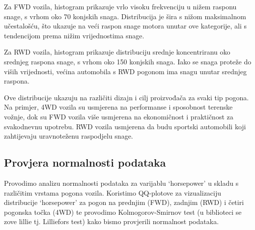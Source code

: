 \documentclass[
]{article}
\newenvironment{Shaded}{\begin{snugshade}}{\end{snugshade}}
\newcommand{\AttributeTok}[1]{\textcolor[rgb]{0.13,0.29,0.53}{#1}}
\newcommand{\CommentTok}[1]{\textcolor[rgb]{0.56,0.35,0.01}{\textit{#1}}}
\newcommand{\FunctionTok}[1]{\textcolor[rgb]{0.13,0.29,0.53}{\textbf{#1}}}
\newcommand{\NormalTok}[1]{#1}
\newcommand{\SpecialCharTok}[1]{\textcolor[rgb]{0.81,0.36,0.00}{\textbf{#1}}}
\newcommand{\StringTok}[1]{\textcolor[rgb]{0.31,0.60,0.02}{#1}}
\begin{document}
Za FWD vozila, histogram prikazuje vrlo visoku frekvenciju u nižem
rasponu snage, s vrhom oko 70 konjskih snaga. Distribucija je šira s
nižom maksimalnom učestalošću, što ukazuje na veći raspon snage motora
unutar ove kategorije, ali s tendencijom prema nižim vrijednostima
snage.

Za RWD vozila, histogram prikazuje distribuciju srednje koncentriranu
oko srednjeg raspona snage, s vrhom oko 150 konjskih snaga. Iako se
snaga proteže do viših vrijednosti, većina automobila s RWD pogonom ima
snagu unutar srednjeg raspona.

Ove distribucije ukazuju na različiti dizajn i cilj proizvođača za svaki
tip pogona. Na primjer, 4WD vozila su usmjerena na performanse i
sposobnost terenske vožnje, dok su FWD vozila više usmjerena na
ekonomičnost i praktičnost za svakodnevnu upotrebu. RWD vozila usmjerena
da budu sportski automobili koji zahtijevaju uravnoteženu raspodjelu
snage.

\subsection{Provjera normalnosti
podataka}\label{provjera-normalnosti-podataka}

Provodimo analizu normalnosti podataka za varijablu `horsepower' u
skladu s različitim vrstama pogona vozila. Koristimo QQ-plotove za
vizualizaciju distribucije `horsepower' za pogon na prednjim (FWD),
zadnjim (RWD) i četiri pogonska točka (4WD) te provodimo
Kolmogorov-Smirnov test (u biblioteci se zove lillie tj. Lilliefors
test) kako bismo provjerili normalnost podataka.

\begin{Shaded}
\end{Shaded}
\end{document}
